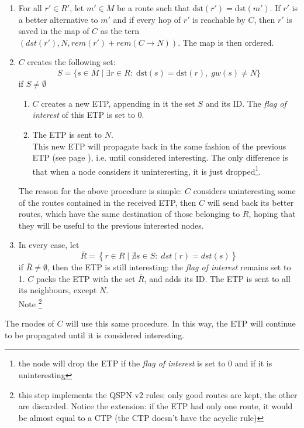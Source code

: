 \documentclass[a4paper]{article}
\newcommand{\T}[1]{\textrm{#1}}
\newcommand{\pgra}[1]{\left\{#1\right\}}
\def\ove#1{{\overline{#1}}}
\def\0{{\emptyset}}
\begin{document}
\begin{description}
\begin{enumerate}
		\[\T{dst}(m)=\T{dst}(r),\;\;\T{gw}(m)=N
		\]
		If $m$ exists, then $C$ sets $\T{rem}(m):=\T{rem}(r)$
		\footnote{with this operation we are actually replacing $m$
		with $r$, in the map $M$}.
		Otherwise, $r$ is copied in the temporary set $R'$.\\
		$M$ is sorted, i.e. the routes of the map of $C$ are sorted in
		order of efficiency.
	\item For all $r' \in R'$,
		\label{ETPstep3}
		\label{ETPstep3a}
		let $m'\in M$ be a route such that
		$\T{dst}(r')=\T{dst}(m')$. If
		$r'$ is a better alternative to $m'$ and if
		every hop of $r'$ is reachable by $C$,
		then $r'$  is saved in the map of $C$ as the
		tern $(dst(r'), N, rem(r')+rem(C\rightarrow
		N))$. The map is then ordered.
	\item $C$ creates the following set:
		\[
		S=\{s\in \ove M\;|\; \exists r\in R:\;\T{dst}(s)=\T{dst}(r),\;gw(s)\neq N\}
		\]
		if $S\neq \0$
		\begin{enumerate}
			\item $C$ creates a new ETP, appending in it the set $S$ and its ID. 
				The \emph{flag of interest} of this ETP is set to 0. 
			\item The ETP is sent to $N$.\\
				This new ETP will propagate back in the
				same fashion of the previous ETP (see page \pageref{ETPrule1}), i.e.
				until considered interesting. The only difference is that when a node
				considers it uninteresting, it is just dropped\footnote{the node will
				drop the ETP if the \emph{flag of interest} is set to 0 and if it is
				uninteresting}.
		\end{enumerate}
		The reason for the above procedure is simple: $C$ considers
		uninteresting some of the routes contained in the received
		ETP, then $C$ will send back its better routes, which have the same destination of
		those belonging to $R$, hoping that they will be useful to the
		previous interested nodes.
	\item In every case, 
		let \[\ove R=\pgra{r\in R\;|\;\nexists s\in S:\;dst(r)=dst(s)}\] 
		if $\ove R \neq \0$, then the ETP is still interesting: 
		the \emph{flag of interest} remains set to 1.
		$C$ packs the ETP with the set $\ove R$, and adds its ID.
		The ETP is sent to all its neighbours, except $N$.\\
		Note \footnote{this step implements the QSPN v2 rules: only
		good routes are kept, the other are discarded. Notice
		the extension: if the ETP had only one route, it would be
		almost equal to a CTP (the CTP doesn't have the acyclic rule)}
	\end{enumerate}
	The rnodes of $C$ will use this same procedure. In this way, the ETP
	will continue to be propagated until it is considered interesting.


\end{description}
\end{document}
